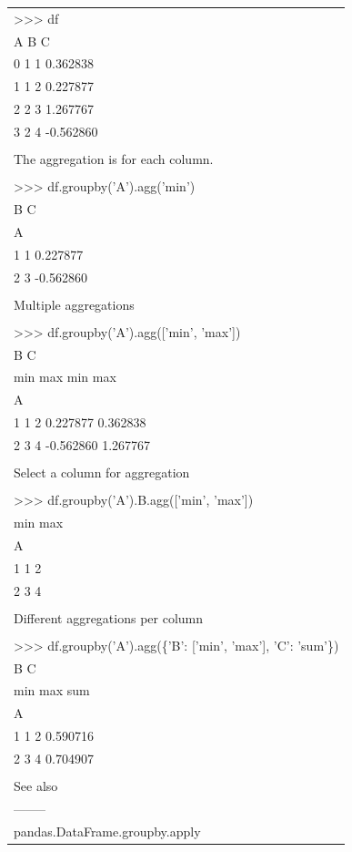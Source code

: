 \documentclass[11pt]{article}
\begin{document}
\begin{enumerate}
\begin{enumerate}
\begin{enumerate}
\begin{center}
\begin{tabular}{l}
\\
>>> df\\
A  B         C\\
0  1  1  0.362838\\
1  1  2  0.227877\\
2  2  3  1.267767\\
3  2  4 -0.562860\\
\\
The aggregation is for each column.\\
\\
>>> df.groupby('A').agg('min')\\
B         C\\
A\\
1  1  0.227877\\
2  3 -0.562860\\
\\
Multiple aggregations\\
\\
>>> df.groupby('A').agg(['min', 'max'])\\
B             C\\
min max       min       max\\
A\\
1   1   2  0.227877  0.362838\\
2   3   4 -0.562860  1.267767\\
\\
Select a column for aggregation\\
\\
>>> df.groupby('A').B.agg(['min', 'max'])\\
min  max\\
A\\
1    1    2\\
2    3    4\\
\\
Different aggregations per column\\
\\
>>> df.groupby('A').agg(\{'B': ['min', 'max'], 'C': 'sum'\})\\
B             C\\
min max       sum\\
A\\
1   1   2  0.590716\\
2   3   4  0.704907\\
\\
See also\\
--------\\
pandas.DataFrame.groupby.apply\\

\end{tabular}
\end{center}
\end{enumerate}
\end{enumerate}
\end{enumerate}
\end{document}
